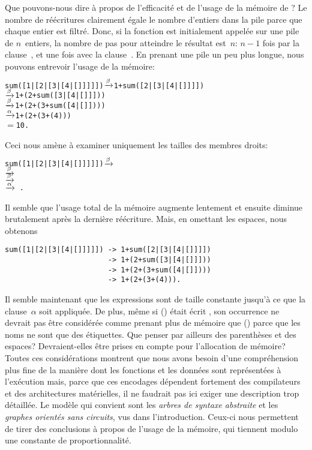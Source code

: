 Que pouvons-nous dire à propos de l'efficacité et de l'usage de la
mémoire de ? Le nombre de réécritures clairement égale
le nombre d'entiers dans la pile parce que chaque entier est
filtré. Donc, si la fonction est initialement appelée sur une pile de
\(n\)~entiers, la nombre de pas pour atteindre le résultat est~\(n\):
\(n-1\) fois par la clause~\clause{\beta}, et une fois avec la
clause~\clause{\alpha}. En prenant une pile un peu plus longue, nous
pouvons entrevoir l'usage de la mémoire:
\begin{alltt}
sum([1|[2|[3|[4|[]]]]]) \(\xrightarrow{\smash[t]{\beta}}\) 1 + sum([2|[3|[4|[]]]])
                        \(\xrightarrow{\smash[t]{\beta}}\) 1 + (2 + sum([3|[4|[]]]))
                        \(\xrightarrow{\smash[t]{\beta}}\) 1 + (2 + (3 + sum([4|[]])))
                        \(\xrightarrow{\smash[t]{\alpha}}\) 1 + (2 + (3 + (4)))
                        \(=\) 10\textrm{.}
\end{alltt}
Ceci nous amène à examiner uniquement les tailles des membres droits:
\begin{alltt}
sum([1|[2|[3|[4|[]]]]]) \(\xrightarrow{\smash[t]{\beta}}\) 
                        \(\xrightarrow{\smash[t]{\beta}}\) 
                        \(\xrightarrow{\smash[t]{\beta}}\) 
                        \(\xrightarrow{\smash[t]{\alpha}}\) \,\textrm{.}
\end{alltt}
Il semble que l'usage total de la mémoire augmente lentement et
ensuite diminue brutalement après la dernière réécriture. Mais, en
omettant les espaces, nous obtenons
\begin{verbatim}
sum([1|[2|[3|[4|[]]]]]) -> 1+sum([2|[3|[4|[]]]])
                        -> 1+(2+sum([3|[4|[]]]))
                        -> 1+(2+(3+sum([4|[]])))
                        -> 1+(2+(3+(4))).
\end{verbatim}
Il semble maintenant que les expressions sont de taille constante
jusqu'à ce que la clause~\(\alpha\) soit appliquée. De plus, même si
(\erlcode{+}) était écrit , son occurrence ne devrait
pas être considérée comme prenant plus de mémoire que (\erlcode{+})
parce que les noms ne sont que des étiquettes. Que penser par ailleurs
des parenthèses et des espaces? Devraient-elles être prises en compte
pour l'allocation de mémoire? Toutes ces considérations montrent que
nous avons besoin d'une compréhension plus fine de la manière dont les
fonctions \Erlang et les données sont représentées à l'exécution mais,
parce que ces encodages dépendent fortement des compilateurs et des
architectures matérielles, il ne faudrait pas ici exiger une
description trop détaillée. Le modèle qui convient sont les
\emph{arbres de syntaxe abstraite} et les \emph{graphes orientés sans
  circuits}, vus dans l'introduction. Ceux-ci nous permettent de tirer
des conclusions à propos de l'usage de la mémoire, qui tiennent modulo
une constante de proportionnalité.


